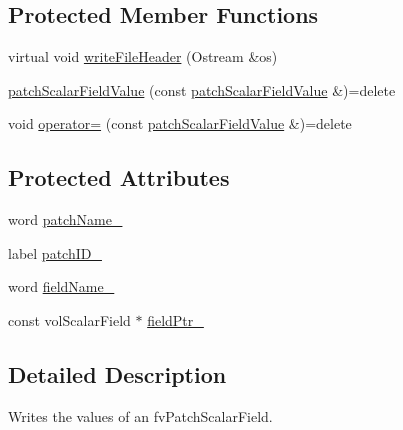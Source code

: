 \subsection*{Protected Member Functions}
\begin{DoxyCompactItemize}
\item 
virtual void \hyperlink{classFoam_1_1functionObjects_1_1patchScalarFieldValue_ad0c7a238f021a605e38a115efbb20aa3}{write\+File\+Header} (Ostream \&os)
\item 
\hyperlink{classFoam_1_1functionObjects_1_1patchScalarFieldValue_a5e4655fd44b51a275b104ff26d9d2e18}{patch\+Scalar\+Field\+Value} (const \hyperlink{classFoam_1_1functionObjects_1_1patchScalarFieldValue}{patch\+Scalar\+Field\+Value} \&)=delete
\item 
void \hyperlink{classFoam_1_1functionObjects_1_1patchScalarFieldValue_ad1b00016378c2824a6e92620da4b53ad}{operator=} (const \hyperlink{classFoam_1_1functionObjects_1_1patchScalarFieldValue}{patch\+Scalar\+Field\+Value} \&)=delete
\end{DoxyCompactItemize}
\subsection*{Protected Attributes}
\begin{DoxyCompactItemize}
\item 
word \hyperlink{classFoam_1_1functionObjects_1_1patchScalarFieldValue_a277faeb1fab819b0c4b54af88c6f56c2}{patch\+Name\+\_\+}
\item 
label \hyperlink{classFoam_1_1functionObjects_1_1patchScalarFieldValue_abf52f9506022b39dbfcc5d4fe993a5df}{patch\+I\+D\+\_\+}
\item 
word \hyperlink{classFoam_1_1functionObjects_1_1patchScalarFieldValue_a84505e826985ad10d53f4063d43128ea}{field\+Name\+\_\+}
\item 
const vol\+Scalar\+Field $\ast$ \hyperlink{classFoam_1_1functionObjects_1_1patchScalarFieldValue_af89e3827787d41b150d0943b9dcde75f}{field\+Ptr\+\_\+}
\end{DoxyCompactItemize}


\subsection{Detailed Description}
Writes the values of an fv\+Patch\+Scalar\+Field. 

